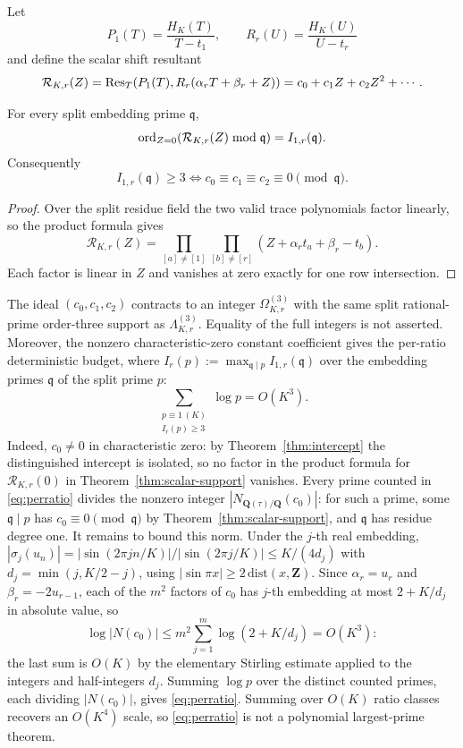 Let
\[
P_1(T)=\frac{H_K(T)}{T-t_1},\qquad
R_r(U)=\frac{H_K(U)}{U-t_r}
\]
and define the scalar shift resultant
\begin{equation}\label{eq:shiftres}
\mathcal R_{K,r}(Z)
 =\operatorname{Res}_T\!\left(P_1(T),R_r(\alpha_rT+\beta_r+Z)\right)
 =c_0+c_1Z+c_2Z^2+\cdots.
\end{equation}

\begin{theorem}\label{thm:scalar-support}
For every split embedding prime $\mathfrak q$,
\begin{equation}\label{eq:ordshift}
\operatorname{ord}_{Z=0}(\mathcal R_{K,r}(Z)\bmod\mathfrak q)
 =I_{1,r}(\mathfrak q).
\end{equation}
Consequently
\[
I_{1,r}(\mathfrak q)\ge3
\iff
c_0\equiv c_1\equiv c_2\equiv0\pmod{\mathfrak q}.
\]
\end{theorem}

\begin{proof}
Over the split residue field the two valid trace polynomials factor linearly,
so the product formula gives
\[
\mathcal R_{K,r}(Z)
 =\prod_{[a]\ne[1]}\prod_{[b]\ne[r]}
   (Z+\alpha_rt_a+\beta_r-t_b).
\]
Each factor is linear in $Z$ and vanishes at zero exactly for one row
intersection.
\end{proof}

The ideal $(c_0,c_1,c_2)$ contracts to an integer
$\Omega_{K,r}^{(3)}$ with the same split rational-prime order-three support as
$\Lambda_{K,r}^{(3)}$.  Equality of the full integers is not asserted.
Moreover, the nonzero characteristic-zero constant coefficient gives the
per-ratio deterministic budget, where
$I_r(p):=\max_{\mathfrak q\mid p}I_{1,r}(\mathfrak q)$ over the embedding
primes $\mathfrak q$ of the split prime $p$:
\begin{equation}\label{eq:perratio}
\sum_{\substack{p\equiv1\,(K)\\I_r(p)\ge3}}\log p=O(K^3).
\end{equation}
Indeed, $c_0\ne0$ in characteristic zero: by
Theorem~\ref{thm:intercept} the distinguished intercept is isolated, so no
factor in the product formula for $\mathcal R_{K,r}(0)$ in
Theorem~\ref{thm:scalar-support} vanishes.  Every prime counted in
\eqref{eq:perratio} divides the nonzero integer
$|N_{\mathbf Q(\tau)/\mathbf Q}(c_0)|$: for such a prime, some
$\mathfrak q\mid p$ has $c_0\equiv0\pmod{\mathfrak q}$ by
Theorem~\ref{thm:scalar-support}, and $\mathfrak q$ has residue degree
one.  It remains to bound this norm.  Under the $j$-th real embedding,
$|\sigma_j(u_n)|=|\sin(2\pi jn/K)|/|\sin(2\pi j/K)|\le K/(4d_j)$ with
$d_j=\min(j,K/2-j)$, using $|\sin\pi x|\ge2\,\mathrm{dist}(x,\mathbf Z)$.
Since $\alpha_r=u_r$ and $\beta_r=-2u_{r-1}$, each of the $m^2$ factors of
$c_0$ has $j$-th embedding at most $2+K/d_j$ in absolute value, so
\[
\log|N(c_0)|
 \le m^2\sum_{j=1}^m\log(2+K/d_j)=O(K^3):
\]
the last sum is $O(K)$ by the elementary Stirling estimate applied to the
integers and half-integers $d_j$.  Summing $\log p$ over the distinct
counted primes, each dividing $|N(c_0)|$, gives \eqref{eq:perratio}.
Summing over $O(K)$ ratio classes recovers an $O(K^4)$ scale, so
\eqref{eq:perratio} is not a polynomial largest-prime theorem.

